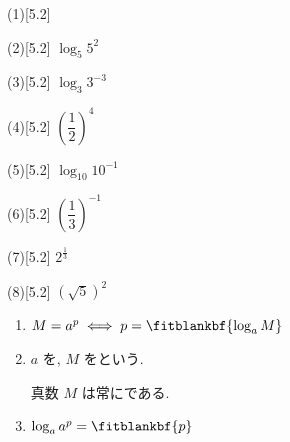 \documentclass[14pt,dvipdfmx]{jsarticle}
\begin{document}
\noindent
\begin{minipage}[t]{0.245\linewidth}
\begin{answerbox}{(1)}[5.2]
\end{answerbox}
\end{minipage}\hfill
\begin{minipage}[t]{0.245\linewidth}
\begin{answerbox}{(2)}[5.2]
  $\log_{5} 5^{2}$
\end{answerbox}
\end{minipage}\hfill
\begin{minipage}[t]{0.245\linewidth}
\begin{answerbox}{(3)}[5.2]
  $\log_{3} 3^{-3}$
\end{answerbox}
\end{minipage}\hfill
\begin{minipage}[t]{0.245\linewidth}
\begin{answerbox}{(4)}[5.2]
  $\left(\dfrac{1}{2}\right)^{4}$
\end{answerbox}
\end{minipage}

\noindent
\begin{minipage}[t]{0.245\linewidth}
\begin{answerbox}{(5)}[5.2]
  $\log_{10} 10^{-1}$
\end{answerbox}
\end{minipage}\hfill
\begin{minipage}[t]{0.245\linewidth}
\begin{answerbox}{(6)}[5.2]
  $\left(\dfrac{1}{3}\right)^{-1}$
\end{answerbox}
\end{minipage}\hfill
\begin{minipage}[t]{0.245\linewidth}
\begin{answerbox}{(7)}[5.2]
  $2^{\frac{1}{3}}$
\end{answerbox}
\end{minipage}\hfill
\begin{minipage}[t]{0.245\linewidth}
\begin{answerbox}{(8)}[5.2]
  $(\sqrt{5})^{2}$
\end{answerbox}
\end{minipage}

\begin{summarybox}
  \begin{enumerate}[label=\textbf{\arabic*}, leftmargin=1.5zw, itemsep=0.02em]
    \item $M = a^p \iff p = \fitblankbf{\log_{a} M}$
    \item $a$ を, $M$ をという.

    真数 $M$ は常にである.
    \item $\log_{a} a^{p} = \fitblankbf{p}$
  \end{enumerate}
\end{summarybox}

\vfill
{}
\end{document}
